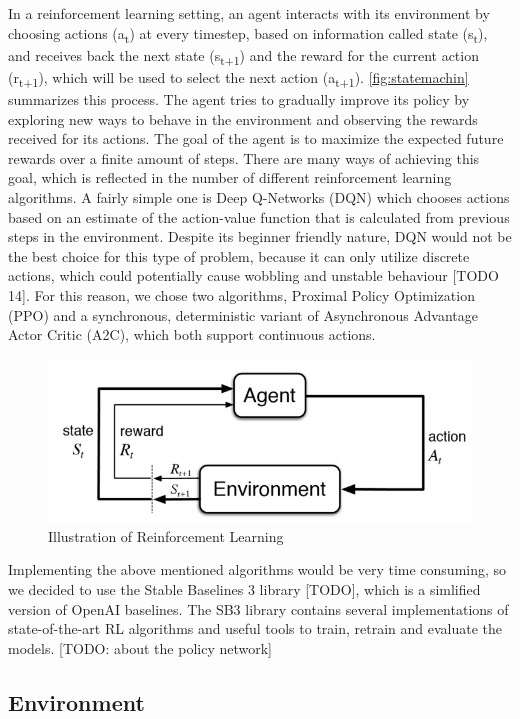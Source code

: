 \documentclass{article}
\begin{document}
In a reinforcement learning setting, an agent interacts with its environment by choosing actions (a\textsubscript{t}) at every timestep, based on information called state (s\textsubscript{t}), and receives back the next state (s\textsubscript{t+1}) and the reward for the current action (r\textsubscript{t+1}), which will be used to select the next action (a\textsubscript{t+1}). \autoref{fig:statemachin} summarizes this process. 
The agent tries to gradually improve its policy by exploring new ways to behave in the environment and observing the rewards received for its actions\cite{dlr_book}. The goal of the agent is to maximize the expected future rewards over a finite amount of steps. 
There are many ways of achieving this goal, which is reflected in the number of different reinforcement learning algorithms. A fairly simple one is Deep Q-Networks (DQN) which chooses actions based on an estimate of the action-value function that is calculated from previous steps in the environment. 
Despite its beginner friendly nature, DQN would not be the best choice for this type of problem, because it can only utilize discrete actions, which could potentially cause wobbling and unstable behaviour [TODO 14]. For this reason, we chose two algorithms, Proximal Policy Optimization (PPO) and a synchronous, deterministic variant of Asynchronous Advantage Actor Critic (A2C), which both support continuous actions.

\begin{figure}[h!]
	\centering
	\includegraphics[width=0.8\linewidth]{rl.jpg}
	\caption{Illustration of Reinforcement Learning}
	\label{fig:statemachin}
\end{figure}

Implementing the above mentioned algorithms would be very time consuming, so we decided to use the Stable Baselines 3 library [TODO], which is a simlified version of OpenAI baselines. The SB3 library contains several implementations of state-of-the-art RL algorithms and useful tools to train, retrain and evaluate the models\cite{stablebase}.
[TODO: about the policy network]

\subsection{\normalsize{Environment}}
\end{document}
